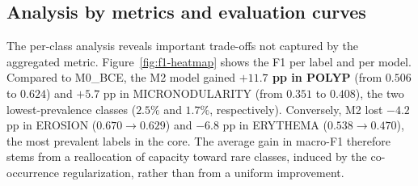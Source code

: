 \documentclass[12pt]{article}
\begin{document}




\subsection{Analysis by metrics and evaluation curves}

The per-class analysis reveals important trade-offs not captured by the aggregated metric. Figure~\ref{fig:f1-heatmap} shows the F1 per label and per model. Compared to M0\_BCE, the M2 model gained \textbf{$+11.7$ pp in POLYP} (from $0.506$ to $0.624$) and $+5.7$ pp in MICRONODULARITY (from $0.351$ to $0.408$), the two lowest-prevalence classes ($2.5\%$ and $1.7\%$, respectively). Conversely, M2 lost $-4.2$ pp in EROSION ($0.670 \to 0.629$) and $-6.8$ pp in ERYTHEMA ($0.538 \to 0.470$), the most prevalent labels in the core. The average gain in macro-F1 therefore stems from a reallocation of capacity toward rare classes, induced by the co-occurrence regularization, rather than from a uniform improvement.
\end{document}
